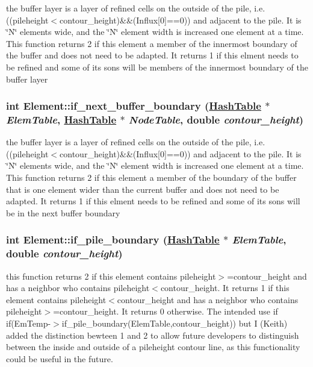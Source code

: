 the buffer layer is a layer of refined cells on the outside of the pile, i.e. ((pileheight$<$contour\_\-height)\&\&(Influx\mbox{[}0\mbox{]}==0)) and adjacent to the pile. It is \char`\"{}N\char`\"{} elements wide, and the \char`\"{}N\char`\"{} element width is increased one element at a time. This function returns 2 if this element a member of the innermost boundary of the buffer and does not need to be adapted. It returns 1 if this elment needs to be refined and some of its sons will be members of the innermost boundary of the buffer layer 

\hypertarget{classElement_a114}{
\subsubsection[if\_\-next\_\-buffer\_\-boundary]{\setlength{\rightskip}{0pt plus 5cm}int Element::if\_\-next\_\-buffer\_\-boundary (\hyperlink{classHashTable}{Hash\-Table} $\ast$ {\em Elem\-Table}, \hyperlink{classHashTable}{Hash\-Table} $\ast$ {\em Node\-Table}, double {\em contour\_\-height})}}
\label{classElement_a114}


the buffer layer is a layer of refined cells on the outside of the pile, i.e. ((pileheight$<$contour\_\-height)\&\&(Influx\mbox{[}0\mbox{]}==0)) and adjacent to the pile. It is \char`\"{}N\char`\"{} elements wide, and the \char`\"{}N\char`\"{} element width is increased one element at a time. This function returns 2 if this element a member of the boundary of the buffer that is one element wider than the current buffer and does not need to be adapted. It returns 1 if this elment needs to be refined and some of its sons will be in the next buffer boundary 

\hypertarget{classElement_a111}{
\subsubsection[if\_\-pile\_\-boundary]{\setlength{\rightskip}{0pt plus 5cm}int Element::if\_\-pile\_\-boundary (\hyperlink{classHashTable}{Hash\-Table} $\ast$ {\em Elem\-Table}, double {\em contour\_\-height})}}
\label{classElement_a111}


this function returns 2 if this element contains pileheight$>$=contour\_\-height and has a neighbor who contains pileheight$<$contour\_\-height. It returns 1 if this element contains pileheight$<$contour\_\-height and has a neighbor who contains pileheight$>$=contour\_\-height. It returns 0 otherwise. The intended use if if(Em\-Temp-$>$if\_\-pile\_\-boundary(Elem\-Table,contour\_\-height)) but I (Keith) added the distinction bewteen 1 and 2 to allow future developers to distinguish between the inside and outside of a pileheight contour line, as this functionality could be useful in the future. 

